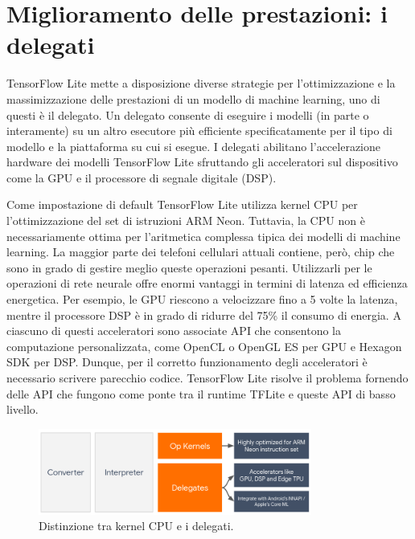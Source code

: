 \section{Miglioramento delle prestazioni: i delegati}
TensorFlow Lite mette a disposizione diverse strategie per l’ottimizzazione e la massimizzazione delle prestazioni di un modello di machine learning,
uno di questi è il delegato. Un delegato consente di eseguire i modelli (in parte o interamente) su un altro esecutore più efficiente specificatamente
per il tipo di modello e la piattaforma su cui si esegue.                                                                                                                                       
I delegati abilitano l'accelerazione hardware dei modelli TensorFlow Lite sfruttando gli acceleratori sul dispositivo come la GPU e il processore di
segnale digitale (DSP).

Come impostazione di default TensorFlow Lite utilizza kernel CPU per l’ottimizzazione del set di istruzioni ARM Neon. Tuttavia, la CPU non è
necessariamente ottima per l'aritmetica complessa tipica dei modelli di machine learning. La maggior parte dei telefoni cellulari attuali contiene,
però, chip che sono in grado di gestire meglio queste operazioni pesanti. Utilizzarli per le operazioni di rete neurale offre enormi vantaggi in termini
di latenza ed efficienza energetica. Per esempio, le GPU riescono a velocizzare fino a 5 volte la latenza, mentre il processore DSP è in grado di ridurre
del 75\% il consumo di energia. A ciascuno di questi acceleratori sono associate API che consentono la computazione personalizzata, come OpenCL o OpenGL
ES per GPU e Hexagon SDK per DSP. Dunque, per il corretto funzionamento degli acceleratori è necessario scrivere parecchio codice. TensorFlow Lite risolve
il problema fornendo delle API che fungono come ponte tra il runtime TFLite e queste API di basso livello.

\begin{figure}[ht]
    \centering
    \includegraphics[width=0.8\textwidth]{Immagini/delegate_runtime.png}
    \caption{Distinzione tra kernel CPU e i delegati.}
    \label{fig:distinzione}
\end{figure}

